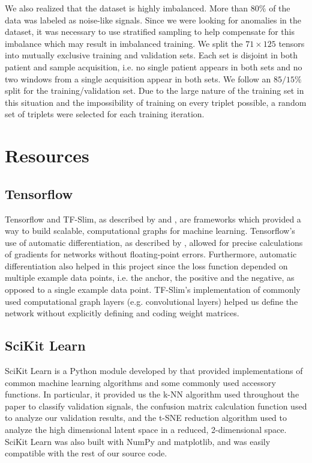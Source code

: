 We also realized that the dataset is highly imbalanced. More than $80\%$ of the data was labeled as noise-like signals. Since we were looking for anomalies in the dataset, it was necessary to use stratified sampling to help compensate for this imbalance which may result in imbalanced training. We split the $71 \times 125$ tensors into mutually exclusive training and validation sets. Each set is disjoint in both patient and sample acquisition, i.e. no single patient appears in both sets and no two windows from a single acquisition appear in both sets. We follow an $85/15\%$ split for the training/validation set. Due to the large nature of the training set in this situation and the impossibility of training on every triplet possible, a random set of triplets were selected for each training iteration. 

\section{Resources}


\subsection*{Tensorflow}

Tensorflow and TF-Slim, as described by \citet{tensorflow} and \citet{tfslim},  are frameworks which provided a way to build scalable, computational graphs for machine learning. Tensorflow's use of automatic differentiation, as described by \citet{autodiff}, allowed for precise calculations of gradients for networks without floating-point errors. Furthermore, automatic differentiation also helped in this project since the loss function depended on multiple example data points, i.e. the anchor, the positive and the negative,  as opposed to a single example data point. TF-Slim's implementation of commonly used computational graph layers (e.g. convolutional layers) helped us define the network without explicitly defining and coding weight matrices. 

\subsection*{SciKit Learn}
SciKit Learn is a Python module developed by \citet{sklearn} that provided implementations of common machine learning algorithms and some commonly used accessory functions. In particular, it provided us the k-NN algorithm used throughout the paper to classify validation signals, the confusion matrix calculation function used to analyze our validation results, and the t-SNE reduction algorithm used to analyze the high dimensional latent space in a reduced, 2-dimensional space. SciKit Learn was also built with NumPy and matplotlib, and was easily compatible with the rest of our source code. 

